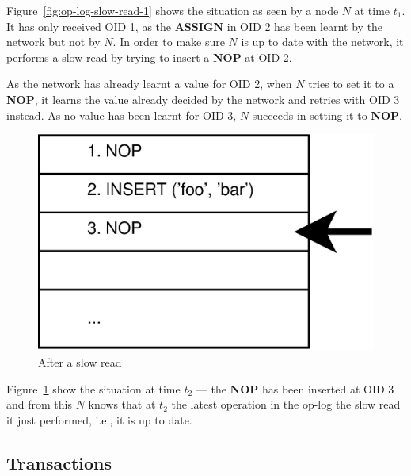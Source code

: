 \documentclass[12pt,twoside,notitlepage]{report}
\newcommand{\op}[1]  {{\bf #1}}         %
\begin{document}
Figure~\ref{fig:op-log-slow-read-1} shows the situation as seen by a node $N$ at time $t_1$. It
has only received OID 1, as the \op{ASSIGN} in OID 2 has been learnt by the network but not by
$N$. In order to make sure $N$ is up to date with the network, it performs a slow read by trying
to insert a \op{NOP} at OID 2.

As the network has already learnt a value for OID 2, when $N$ tries to set it to a \op{NOP}, it
learns the value already decided by the network and retries with OID 3 instead. As no value has
been learnt for OID 3, $N$ succeeds in setting it to \op{NOP}.

\begin{figure}[htb]
\centering
\includegraphics[scale=0.5]{figs/op-log-slow-read-2.eps}
\caption{\label{fig:op-log-slow-read-2}After a slow read}
\end{figure}

Figure~\ref{fig:op-log-slow-read-2} show the situation at time $t_2$ --- the \op{NOP} has been
inserted at OID 3 and from this $N$ knows that at $t_2$ the latest operation in the op-log the
slow read it just performed, i.e., it is up to date.

\subsection{Transactions}
\end{document}
